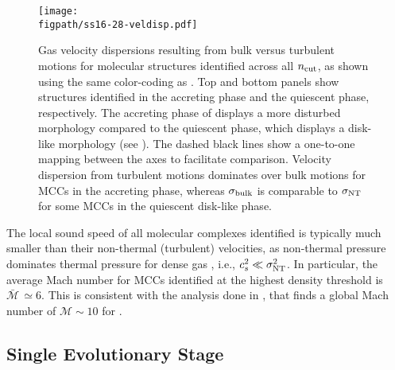 \IfFileExists{emulateapjlegacy.cls}{\documentclass[iop]{emulateapjlegacy}}{\documentclass[iop]{emulateapj}}
\def\figpath{./Fig}
\begin{document}
\begin{figure}
\centering
\texttt{[image: \\figpath/ss16-28-veldisp.pdf]}
\caption{Gas velocity dispersions resulting from bulk versus turbulent motions for molecular structures 
identified across all $n_{\rm cut}$, as shown using the same color-coding as .
%
Top and bottom panels show structures identified in the accreting phase and the quiescent phase, respectively.
The accreting phase of \flower displays a more disturbed morphology compared to the quiescent phase, which displays a disk-like morphology (see ).
%
The dashed black lines show a one-to-one mapping between the axes to facilitate comparison. 
%
Velocity dispersion from turbulent motions dominates over bulk motions for MCCs in the accreting phase, whereas 
$\sigma_{\rm bulk}$ is comparable to $\sigma_{\rm NT}$ for some MCCs in the quiescent disk-like phase.
\label{fig:vv}}
\vspace{0.5em}
\end{figure}

The local sound speed of all molecular complexes identified is typically much smaller than their non-thermal (turbulent) velocities,
as non-thermal pressure dominates thermal pressure for dense gas \citep{Pallottini17b}, i.e., $c_s^2 \ll \sigma_{\rm NT}^2$. In particular, the average Mach number for MCCs identified at the highest density threshold is $\bar{\mathcal{M}}\,\simeq6$. This is consistent with the analysis done in \citet{Vallini18a}, that finds a global Mach number of $\mathcal{M} \sim 10$ for \flower.

\subsection{Single Evolutionary Stage}\label{sec:singless}
\end{document}
